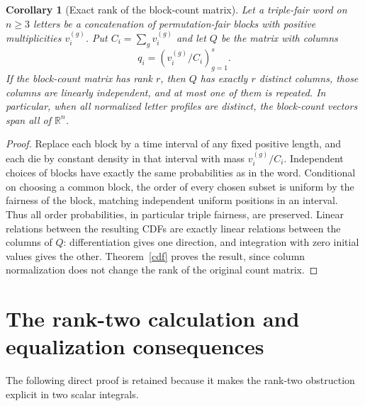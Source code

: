 \documentclass[11pt]{article}
\newtheorem{corollary}[theorem]{Corollary}
\begin{document}
\begin{corollary}[Exact rank of the block-count matrix]\label{rank}
Let a triple-fair word on $n\ge3$ letters be a concatenation of
permutation-fair blocks with positive multiplicities $v_i^{(g)}$.
Put $C_i=\sum_gv_i^{(g)}$ and let $Q$ be the matrix with columns
\[
 q_i=(v_i^{(g)}/C_i)_{g=1}^s.
\]
If the block-count matrix has rank $r$, then $Q$ has exactly $r$
distinct columns, those columns are linearly independent, and at most
one of them is repeated. In particular, when all normalized letter
profiles are distinct, the block-count vectors span all of
$\mathbb R^n$.
\end{corollary}
\begin{proof}
Replace each block by a time interval of any fixed positive length,
and each die by constant density in that interval with mass
$v_i^{(g)}/C_i$. Independent choices of blocks have exactly the same
probabilities as in the word. Conditional on choosing a common block,
the order of every chosen subset is uniform by the fairness of the
block, matching independent uniform positions in an interval. Thus all
order probabilities, in particular triple fairness, are preserved.
Linear relations between the resulting CDFs are exactly linear relations
between the columns of $Q$: differentiation gives one direction, and
integration with zero initial values gives the other.
Theorem~\ref{cdf} proves the result, since column normalization does not
change the rank of the original count matrix.
\end{proof}

\section{The rank-two calculation and equalization consequences}
The following direct proof is retained because it makes the rank-two
obstruction explicit in two scalar integrals.
\end{document}
